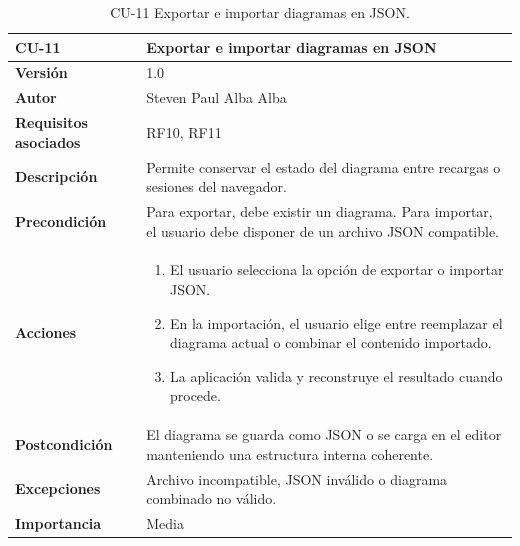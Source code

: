 \begin{table}[p]
\centering
\begin{tabularx}{\linewidth}{ p{} p{} }
\toprule
\textbf{CU-11} & \textbf{Exportar e importar diagramas en JSON}\\
\toprule
\textbf{Versión} & 1.0 \\
\textbf{Autor} & Steven Paul Alba Alba \\
\textbf{Requisitos asociados} & RF10, RF11 \\
\textbf{Descripción} & Permite conservar el estado del diagrama entre recargas o sesiones del navegador. \\
\textbf{Precondición} & Para exportar, debe existir un diagrama. Para importar, el usuario debe disponer de un archivo JSON compatible. \\
\textbf{Acciones} &
\begin{enumerate}
\def\labelenumi{\arabic{enumi}.}
\tightlist
\item El usuario selecciona la opción de exportar o importar JSON.
\item En la importación, el usuario elige entre reemplazar el diagrama actual o combinar el contenido importado.
\item La aplicación valida y reconstruye el resultado cuando procede.
\end{enumerate}\\
\textbf{Postcondición} & El diagrama se guarda como JSON o se carga en el editor manteniendo una estructura interna coherente. \\
\textbf{Excepciones} & Archivo incompatible, JSON inválido o diagrama combinado no válido. \\
\textbf{Importancia} & Media \\
\bottomrule
\end{tabularx}
\caption{CU-11 Exportar e importar diagramas en JSON.}
\end{table}

